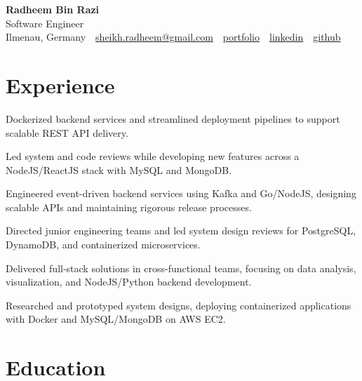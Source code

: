 \documentclass[11pt,a4paper]{resume}
\makeatletter
\newcommand{\Portfolio}{https://radheem.github.io/my-cv}
\newcommand{\PortfolioText}{portfolio}
\newcommand{\GitHub}{https://github.com/radheem}
\newcommand{\LinkedIn}{https://www.linkedin.com/in/radheem-razi}
\newcommand{\Email}{sheikh.radheem@gmail.com}
\makeatother
\begin{document}
\begin{center}
  {\huge\bfseries Radheem Bin Razi}\\[3pt]
  {\large Software Engineer}\\[6pt]
  \small
  Ilmenau, Germany \,\textbar\,
  \href{mailto:\Email}{\Email} \,\textbar\,
  \href{\Portfolio}{\PortfolioText} \,\textbar\,
  \href{\LinkedIn}{linkedin} \,\textbar\,
  \href{\GitHub}{github}
\end{center}
\vspace{2pt}

\section{Experience}

\bullets
  \item Dockerized backend services and streamlined deployment pipelines to support scalable REST API delivery.
  \item Led system and code reviews while developing new features across a NodeJS/ReactJS stack with MySQL and MongoDB.
\bulletsend
\vspace{3pt}
\bullets
  \item Engineered event-driven backend services using Kafka and Go/NodeJS, designing scalable APIs and maintaining rigorous release processes.
  \item Directed junior engineering teams and led system design reviews for PostgreSQL, DynamoDB, and containerized microservices.
\bulletsend
\vspace{3pt}
\bullets
  \item Delivered full-stack solutions in cross-functional teams, focusing on data analysis, visualization, and NodeJS/Python backend development.
  \item Researched and prototyped system designs, deploying containerized applications with Docker and MySQL/MongoDB on AWS EC2.
\bulletsend
\vspace{3pt}

\section{Education}

\vspace{2pt}
\end{document}

